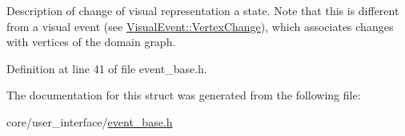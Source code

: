 Description of change of visual representation a state. Note that this is different from a visual event (see \hyperlink{structVisualEvent_1_1VertexChange}{Visual\+Event\+::\+Vertex\+Change}), which associates changes with vertices of the domain graph. 

Definition at line 41 of file event\+\_\+base.\+h.



The documentation for this struct was generated from the following file\+:\begin{DoxyCompactItemize}
\item 
core/user\+\_\+interface/\hyperlink{event__base_8h}{event\+\_\+base.\+h}\end{DoxyCompactItemize}
